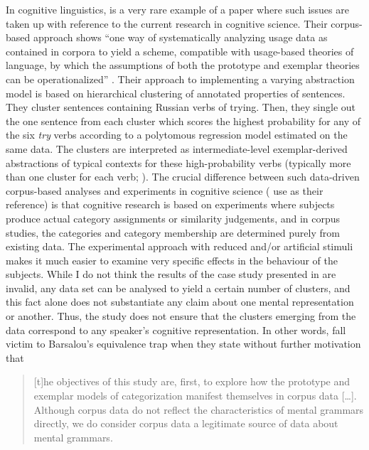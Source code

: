 In cognitive linguistics, \citet{DivjakArppe2013} is a very rare example of a paper where such issues are taken up with reference to the current research in cognitive science.
Their corpus-based approach shows ``one way of systematically analyzing usage data as contained in corpora to yield a scheme, compatible with usage-based theories of language, by which the assumptions of both the prototype and exemplar theories can be operationalized'' \citep[267]{DivjakArppe2013}.
Their approach to implementing a varying abstraction model \citep[254--260]{DivjakArppe2013} is based on hierarchical clustering of annotated properties of sentences.
They cluster sentences containing Russian verbs of trying.
Then, they single out the one sentence from each cluster which scores the highest probability for any of the six \textit{try} verbs according to a polytomous regression model estimated on the same data.
The clusters are interpreted as intermediate-level exemplar-derived abstractions of typical contexts for these high-probability verbs (typically more than one cluster for each verb; \citealt[255--256]{DivjakArppe2013}).
The crucial difference between such data-driven corpus-based analyses and experiments in cognitive science (\citealt{DivjakArppe2013} use \citealt{VerbeemenEa2007} as their reference) is that cognitive research is based on experiments where subjects produce actual category assignments or similarity judgements, and in corpus studies, the categories and category membership are determined purely from existing data.
The experimental approach with reduced and\slash or artificial stimuli makes it much easier to examine very specific effects in the behaviour of the subjects.
While I do not think the results of the case study presented in \citet{DivjakArppe2013} are invalid, any data set can be analysed to yield a certain number of clusters, and this fact alone does not substantiate any claim about one mental representation or another.
Thus, the study does not ensure that the clusters emerging from the data correspond to any speaker's cognitive representation.
In other words, \citet[229--230]{DivjakArppe2013} fall victim to Barsalou's equivalence trap when they state without further motivation that

\begin{quote}
  [t]he objectives of this study are, first, to explore how the prototype and exemplar models of categorization manifest themselves in corpus data [\ldots].
  Although corpus data do not reflect the characteristics of mental grammars directly, we do consider corpus data a legitimate source of data about mental grammars.
\end{quote}

